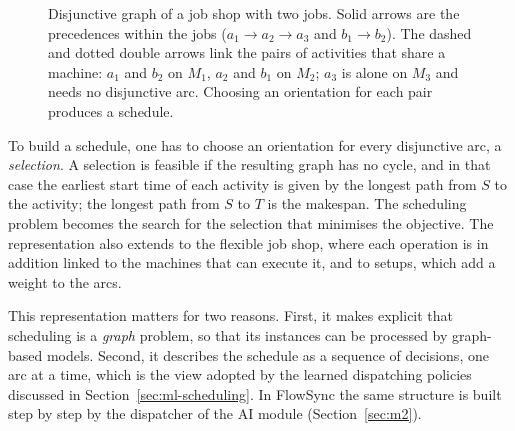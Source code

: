 \begin{figure}[t]
  \centering
  \caption{Disjunctive graph of a job shop with two jobs. Solid arrows are the precedences
    within the jobs ($a_1 \to a_2 \to a_3$ and $b_1 \to b_2$). The dashed and dotted double arrows
    link the pairs of activities that share a machine: $a_1$ and $b_2$ on $M_1$, $a_2$ and $b_1$
    on $M_2$; $a_3$ is alone on $M_3$ and needs no disjunctive arc. Choosing an orientation for each
    pair produces a schedule.}
  \label{fig:disjunctive}
\end{figure}

To build a schedule, one has to choose an orientation for every disjunctive arc, a
\emph{selection}. A selection is feasible if the resulting graph has no cycle, and in that case
the earliest start time of each activity is given by the longest path from $S$ to the activity;
the longest path from $S$ to $T$ is the makespan. The scheduling problem becomes the search for
the selection that minimises the objective. The representation also extends to the flexible job
shop, where each operation is in addition linked to the machines that can execute it, and to
setups, which add a weight to the arcs.

This representation matters for two reasons. First, it makes explicit that scheduling is a
\emph{graph} problem, so that its instances can be processed by graph-based models. Second, it
describes the schedule as a sequence of decisions, one arc at a time, which is the view adopted
by the learned dispatching policies discussed in Section~\ref{sec:ml-scheduling}. In FlowSync the
same structure is built step by step by the dispatcher of the AI module (Section~\ref{sec:m2}).

